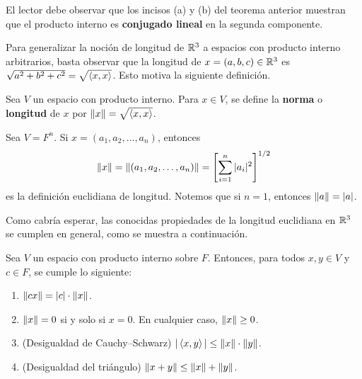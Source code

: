 \documentclass[12pt,a4paper]{book}
\begin{document}
    El lector debe observar que los incisos (a) y (b) del teorema anterior muestran que el producto interno es \textbf{conjugado lineal} en la segunda componente.

    Para generalizar la noción de longitud de $\mathbb{R}^3$ a espacios con producto interno arbitrarios, basta observar que la longitud de $x=(a,b,c)\in\mathbb{R}^3$ es $\sqrt{a^2+b^2+c^2}=\sqrt{\left\langle x, x \right\rangle}$. Esto motiva la siguiente definición.

    \begin{definicion}[Norma]
        Sea $V$ un espacio con producto interno. Para $x\in V$, se define la \textbf{norma} o \textbf{longitud} de $x$ por $\norm{x}=\sqrt{\left\langle x, x \right\rangle}$.
    \end{definicion}

    \begin{ejemplo}
        Sea $V=F^n$. Si $x=(a_1,a_2,\dots,a_n)$, entonces
        \begin{equation*}
            \norm{x}=\norm{(a_1,a_2,\dots,a_n)}=\left[\sum_{i=1}^{n}|a_i|^2\right]^{1/2}
        \end{equation*}
        es la definición euclidiana de longitud. Notemos que si $n=1$, entonces $\norm{a}=|a|$.
    \end{ejemplo}

    Como cabría esperar, las conocidas propiedades de la longitud euclidiana en $\mathbb{R}^3$ se cumplen en general, como se muestra a continuación.

    \begin{teorema}
        Sea $V$ un espacio con producto interno sobre $F$. Entonces, para todos $x,y\in V$ y $c\in F$, se cumple lo siguiente:
        \begin{enumerate}[label=(\alph*)]
            \item $\norm{cx}=|c|\cdot\norm{x}$.
            \item $\norm{x}=0$ si y solo si $x=0$. En cualquier caso, $\norm{x}\geq 0$.
            \item (Desigualdad de Cauchy--Schwarz) $|\left\langle x, y \right\rangle|\leq\norm{x}\cdot\norm{y}$.
            \item (Desigualdad del triángulo) $\norm{x+y}\leq\norm{x}+\norm{y}$.
        \end{enumerate}
    \end{teorema}
\end{document}
